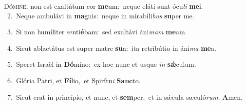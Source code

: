 \lettrine{\initial\textcolor{\initialcolor}{D}}{ómine,} non est exaltátum cor \textbf{me}\-um:~\star neque eláti sunt ócu\textit{li} \textbf{me}\-i.\\
{\numbfont\textcolor{\numbcolor}{~2.}}~Neque ambulávi in \textbf{ma}\-gnis:~\star neque in mirabíli\textit{bus} \textbf{su}\-per me.\par
{\numbfont\textcolor{\numbcolor}{~3.}}~Si non humíliter senti\-\textbf{é}\-bam:~\star sed exaltávi áni\textit{mam} \textbf{me}\-am.\par
{\numbfont\textcolor{\numbcolor}{~4.}}~Sicut ablactátus est super matre \textbf{su}\-a:~\star ita retribútio in áni\textit{ma} \textbf{me}\-a.\par
{\numbfont\textcolor{\numbcolor}{~5.}}~Speret Israël in \textbf{Dó}\-mino:~\star ex hoc nunc et usque \textit{in} \textbf{sǽ}\-culum.\par
{\numbfont\textcolor{\numbcolor}{~6.}}~Glória Patri, et \textbf{Fí}\-lio,~\star et Spirítu\textit{i} \textbf{Sanc}\-to.\par
{\numbfont\textcolor{\numbcolor}{~7.}}~Sicut erat in princípio, et nunc, et \textbf{sem}\-per,~\star et in sǽcula sæculó\-\textit{rum}\-. \textbf{A}\-men.\par
